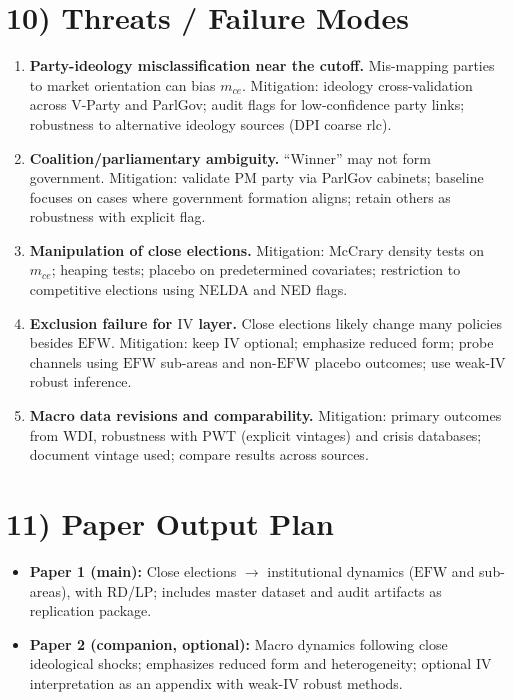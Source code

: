 \documentclass[11pt]{article}
\newcommand{\EFW}{\mathrm{EFW}}
\newcommand{\IV}{\mathrm{IV}}
\newcommand{\1}{\mathbf{1}}
\newcommand{\cid}{c}
\newcommand{\eid}{e}
\begin{document}
\section*{10) Threats / Failure Modes}

\begin{enumerate}[leftmargin=1.2em]
\item \textbf{Party-ideology misclassification near the cutoff.} Mis-mapping parties to market orientation can bias $m_{\cid \eid}$. Mitigation: ideology cross-validation across V-Party and ParlGov; audit flags for low-confidence party links; robustness to alternative ideology sources (DPI coarse rlc).
\item \textbf{Coalition/parliamentary ambiguity.} ``Winner'' may not form government. Mitigation: validate PM party via ParlGov cabinets; baseline focuses on cases where government formation aligns; retain others as robustness with explicit flag.
\item \textbf{Manipulation of close elections.} Mitigation: McCrary density tests on $m_{\cid \eid}$; heaping tests; placebo on predetermined covariates; restriction to competitive elections using NELDA and NED flags.
\item \textbf{Exclusion failure for $\IV$ layer.} Close elections likely change many policies besides $\EFW$. Mitigation: keep $\IV$ optional; emphasize reduced form; probe channels using $\EFW$ sub-areas and non-$\EFW$ placebo outcomes; use weak-IV robust inference.
\item \textbf{Macro data revisions and comparability.} Mitigation: primary outcomes from WDI, robustness with PWT (explicit vintages) and crisis databases; document vintage used; compare results across sources.
\end{enumerate}

\section*{11) Paper Output Plan}

\begin{itemize}[leftmargin=1.2em]
\item \textbf{Paper 1 (main):} Close elections $\rightarrow$ institutional dynamics ($\EFW$ and sub-areas), with RD/LP; includes master dataset and audit artifacts as replication package.
\item \textbf{Paper 2 (companion, optional):} Macro dynamics following close ideological shocks; emphasizes reduced form and heterogeneity; optional $\IV$ interpretation as an appendix with weak-IV robust methods.
\end{itemize}
\end{document}
